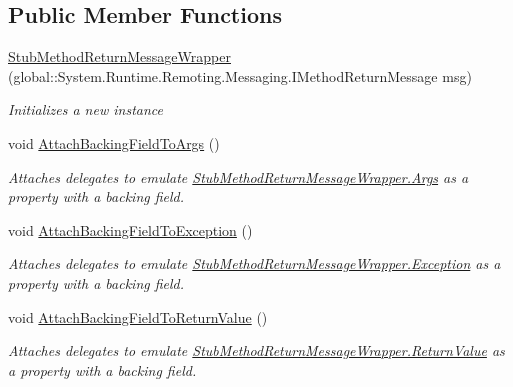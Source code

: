 \subsection*{Public Member Functions}
\begin{DoxyCompactItemize}
\item 
\hyperlink{class_system_1_1_runtime_1_1_remoting_1_1_messaging_1_1_fakes_1_1_stub_method_return_message_wrapper_a14442a89a8d8d4bfb021db21dccabf6a}{Stub\-Method\-Return\-Message\-Wrapper} (global\-::\-System.\-Runtime.\-Remoting.\-Messaging.\-I\-Method\-Return\-Message msg)
\begin{DoxyCompactList}\small\item\em Initializes a new instance\end{DoxyCompactList}\item 
void \hyperlink{class_system_1_1_runtime_1_1_remoting_1_1_messaging_1_1_fakes_1_1_stub_method_return_message_wrapper_a92b78c0d1527a104dee1848c2938c3b7}{Attach\-Backing\-Field\-To\-Args} ()
\begin{DoxyCompactList}\small\item\em Attaches delegates to emulate \hyperlink{class_system_1_1_runtime_1_1_remoting_1_1_messaging_1_1_fakes_1_1_stub_method_return_message_wrapper_ab5dcd25fbdbef1eb62a913483d244468}{Stub\-Method\-Return\-Message\-Wrapper.\-Args} as a property with a backing field.\end{DoxyCompactList}\item 
void \hyperlink{class_system_1_1_runtime_1_1_remoting_1_1_messaging_1_1_fakes_1_1_stub_method_return_message_wrapper_ac3349e79b0329b9a2c4cd6525a8aae5e}{Attach\-Backing\-Field\-To\-Exception} ()
\begin{DoxyCompactList}\small\item\em Attaches delegates to emulate \hyperlink{class_system_1_1_runtime_1_1_remoting_1_1_messaging_1_1_fakes_1_1_stub_method_return_message_wrapper_aed315c6ac968d19a3351e5bec6022617}{Stub\-Method\-Return\-Message\-Wrapper.\-Exception} as a property with a backing field.\end{DoxyCompactList}\item 
void \hyperlink{class_system_1_1_runtime_1_1_remoting_1_1_messaging_1_1_fakes_1_1_stub_method_return_message_wrapper_ac54f1e669a060a12e877de76586a7f55}{Attach\-Backing\-Field\-To\-Return\-Value} ()
\begin{DoxyCompactList}\small\item\em Attaches delegates to emulate \hyperlink{class_system_1_1_runtime_1_1_remoting_1_1_messaging_1_1_fakes_1_1_stub_method_return_message_wrapper_a9fa0a3439053cfaa462624b8fc6ab78c}{Stub\-Method\-Return\-Message\-Wrapper.\-Return\-Value} as a property with a backing field.\end{DoxyCompactList}\item 

\end{DoxyCompactItemize}

